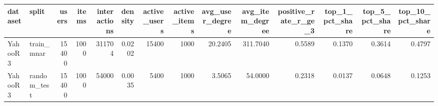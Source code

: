 \begin{tabular}{llrrrrrrrrrrrr}
\toprule
dataset & split & users & items & interactions & density & active_users & active_items & avg_user_degree & avg_item_degree & positive_rate_r_ge_3 & top_1_pct_share & top_5_pct_share & top_10_pct_share \\
\midrule
YahooR3 & train_mnar & 15400 & 1000 & 311704 & 0.0202 & 15400 & 1000 & 20.2405 & 311.7040 & 0.5589 & 0.1370 & 0.3614 & 0.4797 \\
YahooR3 & random_test & 15400 & 1000 & 54000 & 0.0035 & 5400 & 1000 & 3.5065 & 54.0000 & 0.2318 & 0.0137 & 0.0648 & 0.1253 \\
\bottomrule
\end{tabular}
